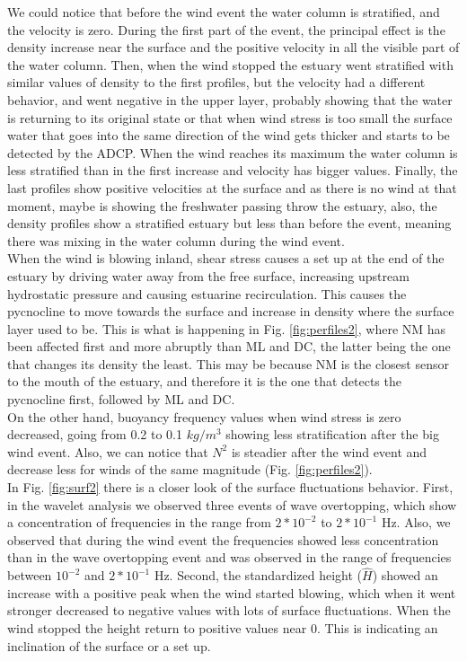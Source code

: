 \documentclass[tesis.tex]{subfiles}
\begin{document}
    We could notice that before the wind event the water column is stratified, and the velocity is zero. During the first part of the event, the principal effect is the density increase near the surface and the positive velocity in all the visible part of the water column. Then, when the wind stopped the estuary went stratified with similar values of density to the first profiles, but the velocity had a different behavior, and went negative in the upper layer, probably showing that the water is returning to its original state or that when wind stress is too small the surface water that goes into the same direction of the wind gets thicker and starts to be detected by the ADCP. When the wind reaches its maximum the water column is less stratified than in the first increase and velocity has bigger values. Finally, the last profiles show positive velocities at the surface and as there is no wind at that moment, maybe is showing the freshwater passing throw the estuary, also, the density profiles show a stratified estuary but less than before the event, meaning there was mixing in the water column during the wind event.\\
    
    When the wind is blowing inland, shear stress causes a set up at the end of the estuary by driving water away from the free surface, increasing upstream hydrostatic pressure and causing estuarine recirculation. This causes the pycnocline to move towards the surface and increase in density where the surface layer used to be. This is what is happening in Fig. \ref{fig:perfiles2}, where NM has been affected first and more abruptly than ML and DC, the latter being the one that changes its density the least. This may be because NM is the closest sensor to the mouth of the estuary, and therefore it is the one that detects the pycnocline first, followed by ML and DC.\\
    
    On the other hand, buoyancy frequency values when wind stress is zero decreased, going from 0.2 to 0.1 $kg/m^3$  showing less stratification after the big wind event. Also, we can notice that $N^2$ is steadier after the wind event and decrease less for winds of the same magnitude (Fig. \ref{fig:perfiles2}).\\

    In Fig. \ref{fig:surf2} there is a closer look of the surface fluctuations behavior. First, in the wavelet analysis we observed three events of wave overtopping, which show a concentration of frequencies in the range from $2*10^{-2}$ to $2*10^{-1}$ Hz. Also, we observed that during the wind event the frequencies showed less concentration than in the wave overtopping event and was observed in the range of frequencies between $10^{-2}$ and $2*10^{-1}$ Hz. Second, the standardized height ($\hat{H}$) showed an increase with a positive peak when the wind started blowing, which when it went stronger decreased to negative values with lots of surface fluctuations. When the wind stopped the height return to positive values near 0. This is indicating an inclination of the surface or a set up. \\
\end{document}

